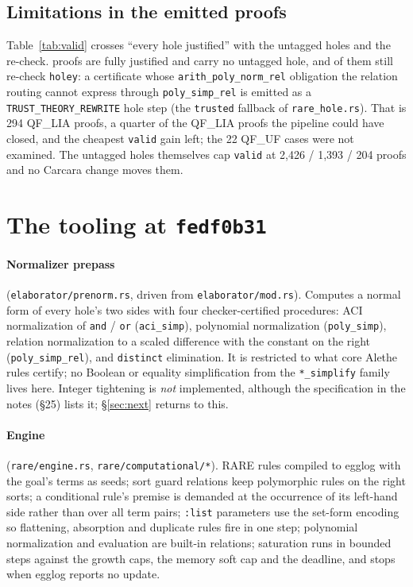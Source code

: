 \documentclass[11pt,a4paper]{article}
\newcommand{\UF}{QF\_UF}
\newcommand{\LIA}{QF\_LIA}
\newcommand{\code}[1]{\texttt{#1}}
\begin{document}
\subsection{Limitations in the emitted proofs}\label{sec:limits}

Table~\ref{tab:valid} crosses ``every hole justified'' with the untagged
holes and the re-check. \nfullyclean{} proofs are fully justified and carry
no untagged hole, and \nfullycleanholey{} of them still re-check
\code{holey}: a certificate whose \code{arith\_poly\_norm\_rel} obligation
the relation routing cannot express through \code{poly\_simp\_rel} is
emitted as a \code{TRUST\_THEORY\_REWRITE} hole step (the \code{trusted}
fallback of \code{rare\_hole.rs}). That is 294 \LIA{} proofs, a quarter of
the \LIA{} proofs the pipeline could have closed, and the cheapest
\code{valid} gain left; the 22 \UF{} cases were not examined. The untagged
holes themselves cap \code{valid} at 2,426 / 1,393 / 204 proofs and no
Carcara change moves them.

\begin{table}[htbp]\centering\small
\resizebox{\textwidth}{!}{}
\caption{Fully justified proofs against the untagged holes and the
  re-check.}\label{tab:valid}
\end{table}

\section{The tooling at \code{fedf0b31}}\label{sec:tooling}

\paragraph{Normalizer prepass} (\code{elaborator/prenorm.rs}, driven from
\code{elaborator/mod.rs}). Computes a normal form of every hole's two sides
with four checker-certified procedures: ACI normalization of \code{and} /
\code{or} (\code{aci\_simp}), polynomial normalization (\code{poly\_simp}),
relation normalization to a scaled difference with the constant on the
right (\code{poly\_simp\_rel}), and \code{distinct} elimination. It is
restricted to what core Alethe rules certify; no Boolean or equality
simplification from the \code{*\_simplify} family lives here. Integer
tightening is \emph{not} implemented, although the specification in the
notes (\S25) lists it; \S\ref{sec:next} returns to this.

\paragraph{Engine} (\code{rare/engine.rs}, \code{rare/computational/*}).
RARE rules compiled to egglog with the goal's terms as seeds; sort guard
relations keep polymorphic rules on the right sorts; a conditional rule's
premise is demanded at the occurrence of its left-hand side rather than
over all term pairs; \code{:list} parameters use the set-form encoding so
flattening, absorption and duplicate rules fire in one step; polynomial
normalization and evaluation are built-in relations; saturation runs in
bounded steps against the growth caps, the memory soft cap and the
deadline, and stops when egglog reports no update.
\end{document}
